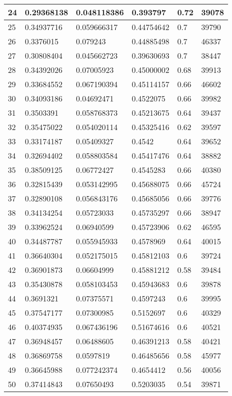 \begin{longtable}{|l|l|l|l|l|l|}
24 & 0.29368138 & 0.048118386 & 0.393797 & 0.72 & 39078 \\ \hline 
25 & 0.34937716 & 0.059666317 & 0.44754642 & 0.7 & 39790 \\ \hline 
26 & 0.3376015 & 0.079243 & 0.44885498 & 0.7 & 46337 \\ \hline 
27 & 0.30808404 & 0.045662723 & 0.39630693 & 0.7 & 38447 \\ \hline 
28 & 0.34392026 & 0.07005923 & 0.45000002 & 0.68 & 39913 \\ \hline 
29 & 0.33684552 & 0.067190394 & 0.45114157 & 0.66 & 46602 \\ \hline 
30 & 0.34093186 & 0.04692471 & 0.4522075 & 0.66 & 39982 \\ \hline 
31 & 0.3503391 & 0.058768373 & 0.45213675 & 0.64 & 39437 \\ \hline 
32 & 0.35475022 & 0.054020114 & 0.45325416 & 0.62 & 39597 \\ \hline 
33 & 0.33174187 & 0.05409327 & 0.4542 & 0.64 & 39652 \\ \hline 
34 & 0.32694402 & 0.058803584 & 0.45417476 & 0.64 & 38882 \\ \hline 
35 & 0.38509125 & 0.06772427 & 0.4545283 & 0.66 & 40380 \\ \hline 
36 & 0.32815439 & 0.053142995 & 0.45688075 & 0.66 & 45724 \\ \hline 
37 & 0.32890108 & 0.056843176 & 0.45685056 & 0.66 & 39776 \\ \hline 
38 & 0.34134254 & 0.05723033 & 0.45735297 & 0.66 & 38947 \\ \hline 
39 & 0.33962524 & 0.06940599 & 0.45723906 & 0.62 & 46595 \\ \hline 
40 & 0.34487787 & 0.055945933 & 0.4578969 & 0.64 & 40015 \\ \hline 
41 & 0.36640304 & 0.052175015 & 0.45812103 & 0.6 & 39724 \\ \hline 
42 & 0.36901873 & 0.06604999 & 0.45881212 & 0.58 & 39484 \\ \hline 
43 & 0.35430878 & 0.058103453 & 0.45943683 & 0.6 & 39878 \\ \hline 
44 & 0.3691321 & 0.07375571 & 0.4597243 & 0.6 & 39995 \\ \hline 
45 & 0.37547177 & 0.07300985 & 0.5152697 & 0.6 & 40329 \\ \hline 
46 & 0.40374935 & 0.067436196 & 0.51674616 & 0.6 & 40521 \\ \hline 
47 & 0.36948457 & 0.06488605 & 0.46391213 & 0.58 & 40421 \\ \hline 
48 & 0.36869758 & 0.0597819 & 0.46485656 & 0.58 & 45977 \\ \hline 
49 & 0.36645988 & 0.077242374 & 0.4654412 & 0.56 & 40056 \\ \hline 
50 & 0.37414843 & 0.07650493 & 0.5203035 & 0.54 & 39871 \\ \hline 
\end{longtable}